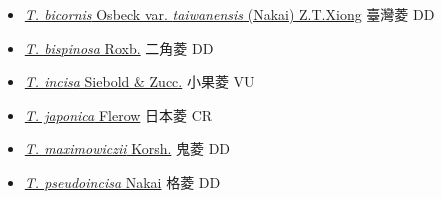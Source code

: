 \begin{itemize}
  \begin{itemize}
        \item[] \href{http://www.theplantlist.org/tpl1.1/search?q=Trapa+bicornis+var.+taiwanensis}{\textit{T. bicornis} Osbeck var. \textit{taiwanensis} (Nakai) Z.T.Xiong}     臺灣菱 DD
        \item[] \href{http://www.theplantlist.org/tpl1.1/search?q=Trapa+bispinosa}{\textit{T. bispinosa} Roxb.}   二角菱 DD
        \item[] \href{http://www.theplantlist.org/tpl1.1/search?q=Trapa+incisa}{\textit{T. incisa} Siebold \& Zucc.}   小果菱 VU
        \item[] \href{http://www.theplantlist.org/tpl1.1/search?q=Trapa+japonica}{\textit{T. japonica} Flerow}     日本菱 CR
        \item[] \href{http://www.theplantlist.org/tpl1.1/search?q=Trapa+maximowiczii}{\textit{T. maximowiczii} Korsh.}     鬼菱 DD
        \item[] \href{http://www.theplantlist.org/tpl1.1/search?q=Trapa+pseudoincisa}{\textit{T. pseudoincisa} Nakai}   格菱 DD
  \end{itemize}
  \end{itemize}
